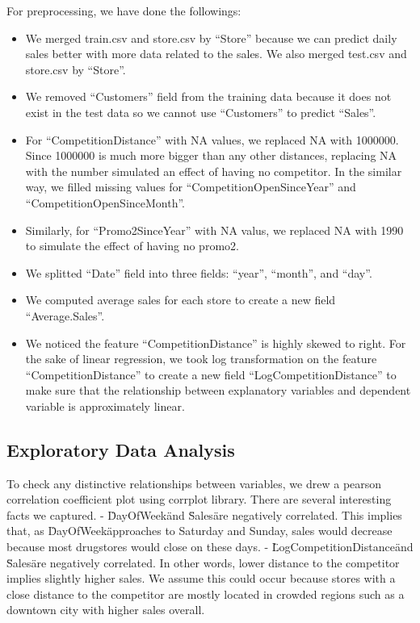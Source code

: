\documentclass[letterpaper,twocolumn,10pt]{article}
\begin{document}
For preprocessing, we have done the followings:
\begin{itemize}
\item We merged train.csv and store.csv by ``Store'' because we can predict daily sales better with more data related to the sales. We also merged test.csv and store.csv by ``Store''.
\item We removed ``Customers'' field from the training data because it does not exist in the test data so we cannot use ``Customers'' to predict ``Sales''.
\item For ``CompetitionDistance'' with NA values, we replaced NA with 1000000. Since 1000000 is much more bigger than any other distances, replacing NA with the number simulated an effect of having no competitor. In the similar way, we filled missing values for ``CompetitionOpenSinceYear'' and ``CompetitionOpenSinceMonth''.
\item Similarly, for ``Promo2SinceYear'' with NA valus, we replaced NA with 1990 to simulate the effect of having no promo2.
\item We splitted ``Date'' field into three fields: ``year'', ``month'', and ``day''.
\item We computed average sales for each store to create a new field ``Average.Sales''.
\item We noticed the feature ``CompetitionDistance'' is highly skewed to right. For the sake of linear regression, we took log transformation on the feature ``CompetitionDistance'' to create a new field ``LogCompetitionDistance'' to make sure that the relationship between explanatory variables and dependent variable is approximately linear.
\end{itemize}


\subsection{Exploratory Data Analysis}
To check any distinctive relationships between variables, we drew a pearson correlation coefficient plot using corrplot library. There are several interesting facts we captured. 
- \"DayOfWeek\" and \"Sales\" are negatively correlated. This implies that, as \"DayOfWeek\" approaches to Saturday and Sunday, sales would decrease because most drugstores would close on these days.
- \"LogCompetitionDistance\" and \"Sales\" are negatively correlated. In other words, lower distance to the competitor implies slightly higher sales. We assume this could occur because stores with a close distance to the competitor are mostly located in crowded regions such as a downtown city with higher sales overall.
\end{document}
